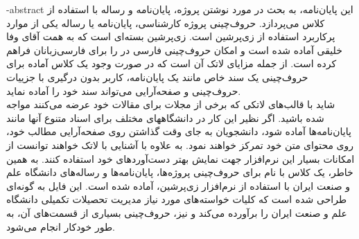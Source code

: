 \fa-abstract{
این پایان‌نامه، به بحث در مورد نوشتن پروژه، پایان‌نامه و رساله با استفاده از کلاس 
می‌پردازد.
حروف‌چینی پروژه کارشناسی، پایان‌نامه یا رساله یکی از موارد پرکاربرد استفاده از زی‌پرشین است. 
زی‌پرشین بسته‌ای است که به همت آقای وفا خلیقی آماده شده است و امکان حروف‌چینی فارسی در \lr{\LaTeXe}{} را  برای فارسی‌زبانان فراهم کرده است.
از جمله مزایای لاتک آن است که در صورت وجود یک کلاس آماده برای حروف‌چینی یک سند خاص مانند یک پایان‌نامه، کاربر بدون درگیری با جزییات حروف‌چینی و صفحه‌آرایی می‌تواند سند خود را آماده نماید.
\\
شاید با قالب‌های لاتکی که برخی از مجلات برای مقالات خود عرضه می‌کنند مواجه شده باشید. اگر نظیر این کار در دانشگاههای مختلف برای اسناد متنوع آنها مانند پایا‌ن‌نامه‌ها آماده شود، دانشجویان به جای وقت گذاشتن روی صفحه‌آرایی مطالب خود، روی محتوای متن خود تمرکز خواهند نمود. به علاوه با آشنایی با لاتک خواهند توانست از امکانات بسیار این نرم‌افزار جهت نمایش بهتر دست‌آوردهای خود استفاده کنند.
به همین خاطر، یک کلاس با نام 
 برای حروف‌چینی پروژه‌ها، پایان‌نامه‌ها و رساله‌های دانشگاه علم و صنعت ایران با استفاده از نرم‌افزار زی‌پرشین،  آماده شده است. این فایل به 
گونه‌ای طراحی شده است که کلیات خواسته‌های مورد نیاز  مدیریت تحصیلات تکمیلی دانشگاه علم و صنعت ایران را برآورده می‌کند و نیز، حروف‌چینی بسیاری از قسمت‌های آن، به طور خودکار انجام می‌شود.
}

